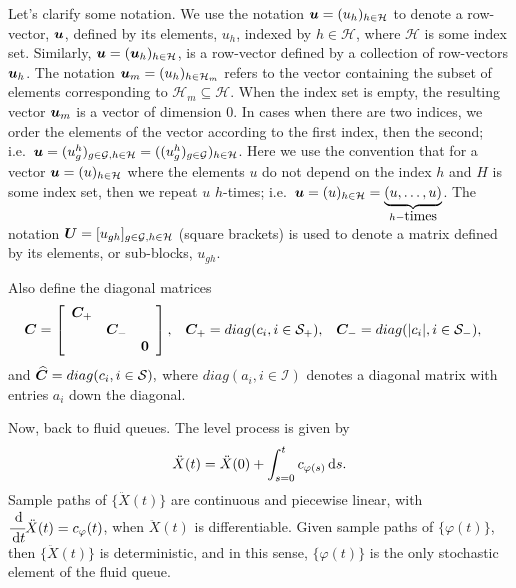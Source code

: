 {Let's clarify some notation. We use the notation \(\boldsymbol u = (u_h)_{h\in \mathcal H}\) to denote a row-vector, \(\boldsymbol u\), defined by its elements, \(u_h\), indexed by \(h\in\mathcal H\), where \(\mathcal H\) is some index set. Similarly, \(\boldsymbol u = (\boldsymbol u_h)_{h\in\mathcal H}\), is a row-vector defined by a collection of row-vectors \(\boldsymbol u_h\). The notation \(\boldsymbol u_m=(u_h)_{h\in\mathcal H_m}\) refers to the vector containing the subset of elements corresponding to \(\mathcal H_m\subseteq \mathcal H\). When the index set is empty, the resulting vector \(\boldsymbol u_m\) is a vector of dimension 0. In cases when there are two indices, we order the elements of the vector according to the first index, then the second; i.e.~\(\boldsymbol u = (u_{g}^h)_{g\in\mathcal G,h\in\mathcal H} = ((u_g^h)_{g\in\mathcal G})_{h\in\mathcal H}\). Here we use the convention that for a vector \(\boldsymbol u=(u)_{h\in \mathcal H}\) where the elements \(u\) do not depend on the index \(h\) and \(H\) is some index set, then we repeat \(u\) \(h\)-times; i.e.~\(\boldsymbol u = (u)_{h\in \mathcal H} =\underbrace{(u,\dots,u)}_{h-\mbox{times}}\). The notation \(\boldsymbol U = [u_{gh}]_{g\in\mathcal G, h\in\mathcal H}\) (square brackets) is used to denote a matrix defined by its elements, or sub-blocks, \(u_{gh}\).} 

Also define the diagonal matrices 
\begin{align*}
	\boldsymbol C &= \left[\begin{array}{ccc} \boldsymbol C_+ && \\ &\boldsymbol C_-& \\ && \boldsymbol 0\end{array}\right], && \boldsymbol C_+ = diag(c_i,i\in\mathcal{S}_+), && \boldsymbol C_- = diag(|c_i|,i\in\mathcal{S}_-),
\end{align*}
and 
\(
	\widehat{\boldsymbol C} = diag(c_i,i\in\mathcal{S}),
\)
where \(diag(a_i,i\in\mathcal I)\) denotes a diagonal matrix with entries \(a_i\) down the diagonal. 

Now, back to fluid queues. The level process is given by 
\[\ddot X(t) = \ddot X(0) + \int_{s=0}^t c_{\varphi(s)}\, \mathrm{d} s.\]
Sample paths of \(\{\ddot X (t)\}\) are continuous and piecewise linear, with \(\cfrac{\, \mathrm{d} }{\, \mathrm{d} t} \ddot X(t) = c_\varphi(t)\), when \(\ddot X(t)\) is differentiable. Given sample paths of \(\{\varphi(t)\}\), then \(\{\ddot X(t)\}\) is deterministic, and in this sense, \(\{\varphi(t)\}\) is the only stochastic element of the fluid queue. 

